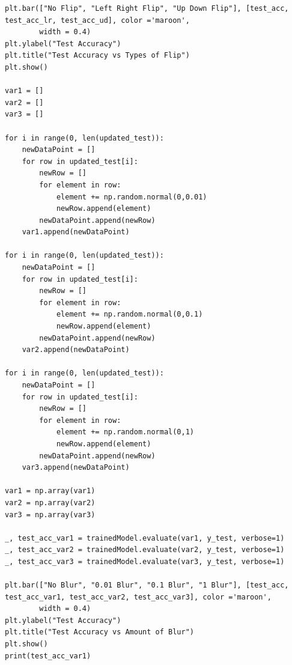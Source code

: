 \documentclass{article}
\begin{document}
\begin{titlepage}
\begin{lstlisting}
plt.bar(["No Flip", "Left Right Flip", "Up Down Flip"], [test_acc, test_acc_lr, test_acc_ud], color ='maroon',
        width = 0.4)
plt.ylabel("Test Accuracy")
plt.title("Test Accuracy vs Types of Flip")
plt.show()

var1 = []
var2 = []
var3 = []

for i in range(0, len(updated_test)):
    newDataPoint = []
    for row in updated_test[i]:
        newRow = []
        for element in row:
            element += np.random.normal(0,0.01)
            newRow.append(element)
        newDataPoint.append(newRow)
    var1.append(newDataPoint)

for i in range(0, len(updated_test)):
    newDataPoint = []
    for row in updated_test[i]:
        newRow = []
        for element in row:
            element += np.random.normal(0,0.1)
            newRow.append(element)
        newDataPoint.append(newRow)
    var2.append(newDataPoint)

for i in range(0, len(updated_test)):
    newDataPoint = []
    for row in updated_test[i]:
        newRow = []
        for element in row:
            element += np.random.normal(0,1)
            newRow.append(element)
        newDataPoint.append(newRow)
    var3.append(newDataPoint)

var1 = np.array(var1)
var2 = np.array(var2)
var3 = np.array(var3)

_, test_acc_var1 = trainedModel.evaluate(var1, y_test, verbose=1)
_, test_acc_var2 = trainedModel.evaluate(var2, y_test, verbose=1)
_, test_acc_var3 = trainedModel.evaluate(var3, y_test, verbose=1)

plt.bar(["No Blur", "0.01 Blur", "0.1 Blur", "1 Blur"], [test_acc, test_acc_var1, test_acc_var2, test_acc_var3], color ='maroon',
        width = 0.4)
plt.ylabel("Test Accuracy")
plt.title("Test Accuracy vs Amount of Blur")
plt.show()
print(test_acc_var1)
\end{lstlisting}
\end{titlepage}
\end{document}
